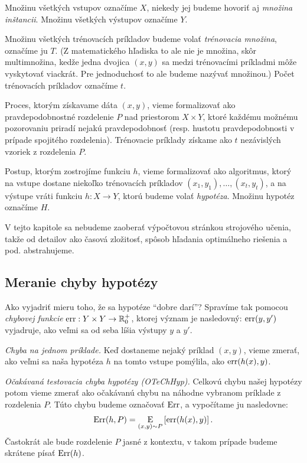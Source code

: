 Množinu všetkých vstupov označíme $X$, niekedy jej budeme hovoriť aj
\emph{množina inštancii}. Množinu všetkých výstupov označíme $Y$.

Množinu všetkých trénovacích príkladov budeme volať \emph{trénovacia
množina}, označíme ju $T$. (Z matematického hľadiska to ale nie je
množina, skôr multimnožina, kedže jedna dvojica $(x, y)$ sa medzi
trénovacími príkladmi môže vyskytovať viackrát. Pre jednoduchosť to
ale budeme nazývať množinou.) Počet trénovacích príkladov označíme $t$.

Proces, ktorým získavame dáta $(x, y)$, vieme formalizovať ako
pravdepodobnostné rozdelenie $P$ nad priestorom $X \times Y$, ktoré
každému možnému pozorovaniu priradí nejakú pravdepodobnosť (resp. hustotu
pravdepodobnosti v prípade spojitého rozdelenia). Trénovacie
príklady získame ako $t$ nezávislých vzoriek z rozdelenia $P$.

Postup, ktorým zostrojíme funkciu $h$, vieme formalizovať ako algoritmus,
ktorý na vstupe dostane niekoľko trénovacích príkladov
$(x_1, y_1), \ldots, (x_t, y_t)$, a na výstupe vráti funkciu $h : X \to Y$,
ktorú budeme volať \emph{hypotéza}. Množinu hypotéz označíme $H$.

V tejto kapitole sa nebudeme zaoberať výpočtovou stránkou strojového
učenia, takže od detailov ako časová zložitosť, spôsob hľadania
optimálneho riešenia a pod. abstrahujeme.



\subsection{Meranie chyby hypotézy}

Ako vyjadriť mieru toho, že sa hypotéze ``dobre darí''? Spravíme tak
pomocou \emph{chybovej funkcie} $\mathrm{err} : Y \times Y \to \mathbb{R}^+_0$,
ktorej význam je nasledovný: $\mathrm{err}(y, y')$ vyjadruje, ako veľmi
sa od seba líšia výstupy $y$ a $y'$.

\emph{Chyba na jednom príklade.} Keď dostaneme nejaký príklad $(x, y)$,
vieme zmerať, ako veľmi sa naša hypotéza $h$ na tomto vstupe pomýlila,
ako $\mathrm{err}(h(x), y)$.

\emph{Očakávaná testovacia chyba hypotézy (OTeChHyp).} Celkovú chybu našej
hypotézy potom vieme zmerať ako očakávanú chybu na náhodne vybranom
príklade z rozdelenia $P$. Túto chybu budeme označovať $\mathrm{Err}$,
a vypočítame ju nasledovne:
$$\mathrm{Err}(h, P) = \operatorname*{\mathrm{E}}_{(x, y) \sim P} \left[ \mathrm{err}(h(x), y) \right].$$
Častokrát ale bude rozdelenie $P$ jasné z kontextu, v takom prípade
budeme skrátene písať $\mathrm{Err}(h)$.

